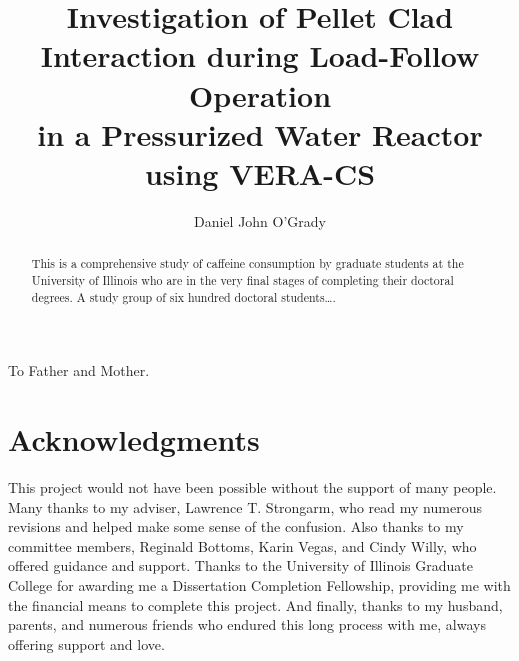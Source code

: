 \documentclass[edeposit,fullpage]{uiucthesis2009}
\begin{document}
\title{Investigation of Pellet Clad Interaction during Load-Follow Operation \\
       in a Pressurized Water Reactor using VERA-CS}
\author{Daniel John O'Grady}
\msthesis
{}
\maketitle

\frontmatter

\begin{abstract}
This is a comprehensive study of caffeine consumption by graduate
students at the University of Illinois who are in the very final
stages of completing their doctoral degrees. A study group of six
hundred doctoral students\ldots.
\end{abstract}

\begin{dedication}
To Father and Mother.
\end{dedication}

\chapter*{Acknowledgments}

This project would not have been possible without the support of
many people. Many thanks to my adviser, Lawrence T. Strongarm, who
read my numerous revisions and helped make some sense of the
confusion. Also thanks to my committee members, Reginald Bottoms,
Karin Vegas, and Cindy Willy, who offered guidance and support.
Thanks to the University of Illinois Graduate College for awarding
me a Dissertation Completion Fellowship, providing me with the
financial means to complete this project. And finally, thanks to
my husband, parents, and numerous friends who endured this long
process with me, always offering support and love.

\end{document}
